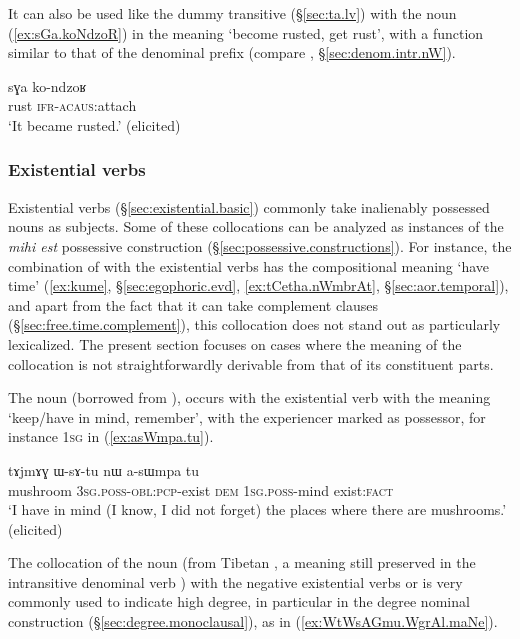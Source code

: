 It can also be used like the dummy transitive  (§\ref{sec:ta.lv}) with the noun  (\ref{ex:sGa.koNdzoR}) in the meaning `become rusted, get rust', with a function similar to that of the  denominal prefix (compare , §\ref{sec:denom.intr.nW}).

\begin{exe}
\ex \label{ex:sGa.koNdzoR}
\gll sɣa ko-ndzoʁ \\
rust \textsc{ifr}-\textsc{acaus}:attach  \\
\glt `It became rusted.' (elicited)
\end{exe}  

 
\subsubsection{Existential verbs} \label{sec:existential.light.verbs}
Existential verbs (§\ref{sec:existential.basic}) commonly take inalienably possessed nouns as subjects. Some of these collocations can be analyzed as instances of the \textit{mihi est} possessive construction (§\ref{sec:possessive.constructions}). For instance, the combination of  with the existential verbs has the compositional meaning `have time' (\ref{ex:kume}, §\ref{sec:egophoric.evd}, \ref{ex:tCetha.nWmbrAt}, §\ref{sec:aor.temporal}), and apart from the fact that it can take complement clauses (§\ref{sec:free.time.complement}), this collocation does not stand out as particularly lexicalized. The present section focuses on cases where the meaning of the collocation is not straightforwardly derivable from that of its constituent parts.

The noun  (borrowed from ),  occurs with the existential verb  with the meaning `keep/have in mind, remember', with the experiencer marked as possessor, for instance \textsc{1sg} in (\ref{ex:asWmpa.tu}).

\begin{exe}
\ex \label{ex:asWmpa.tu}
\gll  tɤjmɤɣ ɯ-sɤ-tu nɯ a-sɯmpa tu \\
mushroom \textsc{3sg}.\textsc{poss}-\textsc{obl}:\textsc{pcp}-exist \textsc{dem} \textsc{1sg}.\textsc{poss}-mind exist:\textsc{fact} \\
\glt `I have in mind (I know, I did not forget) the places where there are mushrooms.' (elicited)
\end{exe}

The collocation of the noun  (from Tibetan , a meaning still preserved in the intransitive denominal verb ) with the negative existential verbs  or  is very commonly used to indicate high degree,  in particular in the degree nominal construction (§\ref{sec:degree.monoclausal}), as in (\ref{ex:WtWsAGmu.WgrAl.maNe}).

